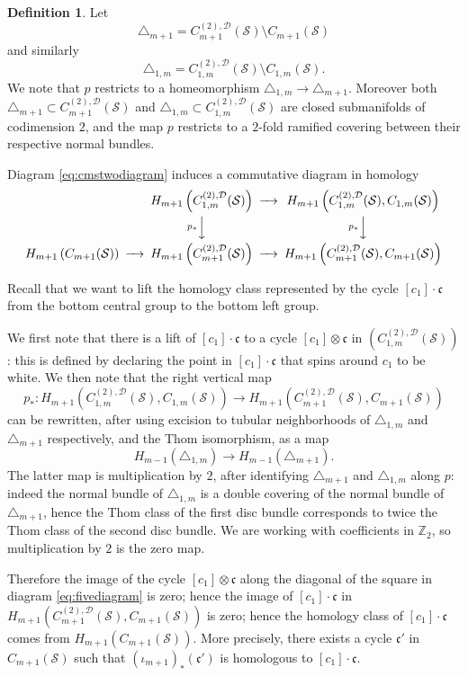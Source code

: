 \documentclass{amsart}
\theoremstyle{plain}
\theoremstyle{definition}
\newtheorem{defn}[thm]  {Definition}
\newcommand{\fc}{\mathfrak{c}}
\newcommand{\D}{\mathcal{D}}
\newcommand{\p}{p}
\renewcommand{\S}{\mathcal{S}}
\newcommand{\Z}{\mathbb{Z}}
\newcommand{\fmstwoD}{C_{1,m}^{(2),\D}(\S)}
\newcommand{\cmstwoD}{C_{m+1}^{(2),\D}(\S)}
\newcommand{\Dmone}{\triangle_{m+1}}
\newcommand{\Donem}{\triangle_{1,m}}
\newcommand{\pa}[1]{\left(#1\right)}
\begin{document}
\begin{defn}
\label{defn:falsediagonals} 
Let 
\[
\Dmone=\cmstwoD\setminus C_{m+1}(\S)
\]
and similarly
\[
\Donem=\fmstwoD\setminus C_{1,m}(\S).
\]
We note that $\p$ restricts to a homeomorphism $\Donem\to\Dmone$. Moreover both $\Dmone\subset\cmstwoD$
and $\Donem\subset\fmstwoD$ are closed submanifolds of codimension $2$, and the map $\p$ restricts to
a $2$-fold ramified covering between their respective normal bundles.
\end{defn}

Diagram \eqref{eq:cmstwodiagram} induces a commutative diagram in homology
\begin{equation}
 \label{eq:fivediagram}
\minCDarrowwidth15pt
 \begin{CD}
  @. H_{m+1}\pa{\fmstwoD} @>>> H_{m+1}\pa{\fmstwoD, C_{1,m}(\S)}\\
  @. @V\p_*VV @V\p_*VV\\
  H_{m+1}\pa{ C_{m+1}(\S)} @>>> H_{m+1}\pa{\cmstwoD} @>>> H_{m+1}\pa{\cmstwoD,C_{m+1}(\S)}
 \end{CD}
\end{equation}

Recall that we want to lift the homology class represented by the cycle $[c_1]\cdot\fc$
from the bottom central group to the bottom left group.

We first note that there is a lift of $[c_1]\cdot\fc$ to a cycle $[c_1]\otimes\fc$ in $\pa{\fmstwoD}$:
this is defined by declaring the point in $[c_1]\cdot\fc$ that spins around $c_1$
to be white. We then note that the right vertical map
\[
\p_*\colon H_{m+1}\pa{\fmstwoD, C_{1,m}(\S)} \to H_{m+1}\pa{\cmstwoD,C_{m+1}(\S)}
\]
can be rewritten, after using excision to tubular neighborhoods of $\Donem$ and $\Dmone$ respectively,
and the Thom isomorphism, as a map
\[
 H_{m-1}(\Donem)\to H_{m-1}(\Dmone).
\]
The latter map is multiplication by $2$, after identifying $\Dmone$ and $\Donem$ along $p$:
indeed the normal bundle of $\Donem$ is a
double covering of the normal bundle of $\Dmone$, hence the Thom class of the first disc
bundle corresponds to twice the Thom class of the second disc bundle. We are working
with coefficients in $\Z_2$, so multiplication by $2$ is the zero map.

Therefore the image of the cycle $[c_1]\otimes \fc$ along the diagonal of the square
in diagram \eqref{eq:fivediagram} is zero; hence the image of $[c_1]\cdot\fc$ in $H_{m+1}\pa{\cmstwoD,C_{m+1}(\S)}$
is zero; hence the homology class of $[c_1]\cdot\fc$ comes from $H_{m+1}(C_{m+1}(\S))$. More
precisely, there exists a cycle $\fc'$ in $C_{m+1}(\S)$ such that $\pa{\iota_{m+1}}_*(\fc')$ is homologous
to $[c_1]\cdot\fc$.
\end{document}
